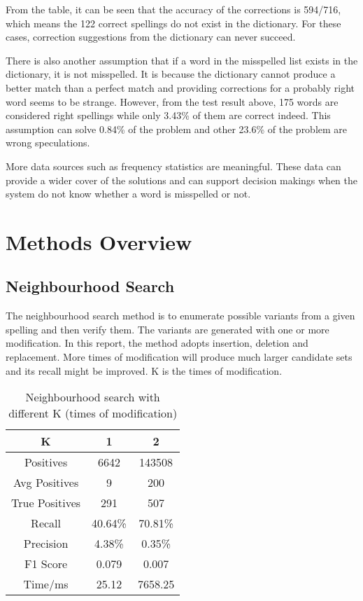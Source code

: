 \documentclass[11pt]{article}
\begin{document}
From the table, it can be seen that the accuracy of the corrections is 594/716, which means the 122 correct spellings do not exist in the dictionary. For these cases, correction suggestions from the dictionary can never succeed. 

There is also another assumption that if a word in the misspelled list exists in the dictionary, it is not misspelled. It is because the dictionary cannot produce a better match than a perfect match and providing corrections for a probably right word seems to be strange. However, from the test result above, 175 words are considered right spellings while only 3.43\% of them are correct indeed. This assumption can solve 0.84\% of the problem and other 23.6\% of the problem are wrong speculations.

More data sources such as frequency statistics are meaningful. These data can provide a wider cover of the solutions and can support decision makings when the system do not know whether a word is misspelled or not. 

\section{Methods Overview}

\subsection{Neighbourhood Search}
The neighbourhood search method is to enumerate possible variants from a given spelling and then verify them. The variants are generated with one or more modification. In this report, the method adopts insertion, deletion and replacement. More times of modification will produce much larger candidate sets and its recall might be improved. K is the times of modification.

\begin{table}[h]
 \begin{center}
\begin{tabular}{ |c||c|c| }
      \hline
      K & 1 & 2 \\
      \hline
      Positives & 6642 & 143508\\
      Avg Positives & 9 & 200\\
      True Positives & 291 & 507\\
      Recall & 40.64\% & 70.81\%\\
      Precision & 4.38\% & 0.35\%\\
      F1 Score & 0.079 & 0.007\\
      Time/ms & 25.12& 7658.25\\
      \hline
\end{tabular}
\caption{Neighbourhood search with different K (times of modification)}\label{table2}
 \end{center}
\end{table}
\end{document}
